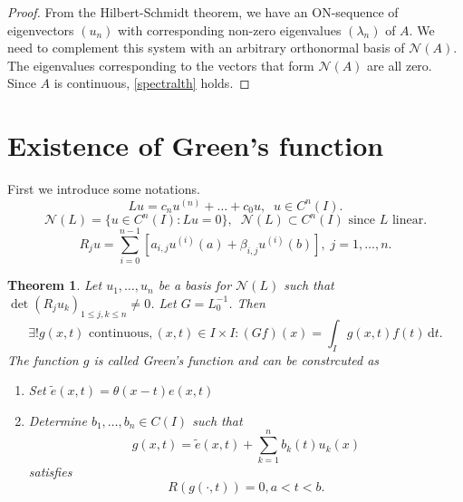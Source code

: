 \documentclass[12pt, a4paper]{article}
\newcommand{\rd}{\ensuremath{\mathrm{d}}}
\newcommand{\id}{\ensuremath{\,\rd}}
\newtheorem{theorem}{Theorem}[section]
\begin{document}
\begin{proof}
From the Hilbert-Schmidt theorem, we have an ON-sequence of eigenvectors $(u_n)$ with corresponding non-zero eigenvalues $(\lambda_n)$ of $A$. We need to complement this system with an arbitrary orthonormal basis of $\mathcal{N}(A)$. The eigenvalues corresponding to the vectors that form $\mathcal{N}(A)$ are all zero. Since $A$ is continuous, \eqref{spectralth} holds.
\end{proof}

\section{Existence of Green's function}
First we introduce some notations.
\begin{equation*}
Lu = c_n u^{(n)} + \dots + c_0 u, \;\; u\in C^n (I).
\end{equation*}
\begin{equation*}
\mathcal{N}(L) = \{u\in C^n(I) : Lu = 0\}, \;\; \mathcal{N}(L) \subset C^n(I) \text{ since } L \text{ linear}.
\end{equation*}
\begin{equation*}
R_j u = \sum_{i=0}^{n-1} [ a_{i,j} u^{(i)} (a) + \beta_{i,j} u^{(i)}(b)],\; j=1,\dots, n.
\end{equation*}

\begin{theorem}
Let $u_1, \dots, u_n$ be a basis for $\mathcal{N}(L)$ such that $\det(R_j u_k)_{1\leq j, k\leq n}\neq 0$. Let $G=L_0^{-1}$. Then
\begin{equation*}
\exists ! g(x,t) \text{ continuous}, (x,t)\in I\times I : (Gf)(x) = \int_I g(x,t)f(t)\id t.
\end{equation*}
The function $g$ is called Green's function and can be constrcuted as
\begin{enumerate}
\item Set $\tilde{e}(x,t) = \theta(x-t)e(x,t)$
\item Determine $b_1, \dots, b_n \in C(I)$ such that
\begin{equation*}
g(x,t) = \tilde{e}(x,t) + \sum_{k=1}^n b_k(t) u_k(x)
\end{equation*}
satisfies
\begin{equation*}
R(g(\cdot,t)) = 0, a<t<b.
\end{equation*}
\end{enumerate}
\end{theorem}
\end{document}
